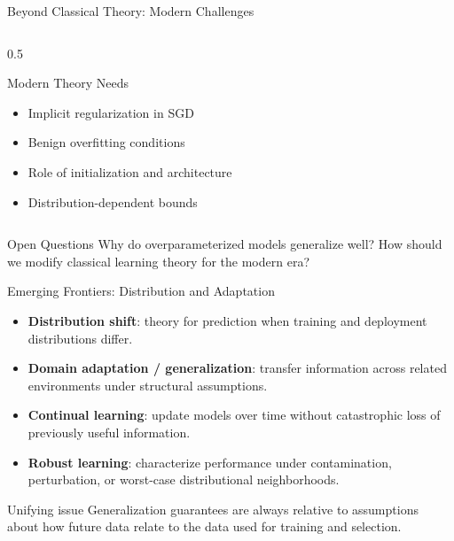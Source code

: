 \documentclass[aspectratio=169,11pt]{beamer}
\begin{document}
\begin{frame}{Beyond Classical Theory: Modern Challenges}
\begin{columns}
\begin{column}{0.5\textwidth}
\begin{block}{Modern Theory Needs}
\begin{itemize}
\item Implicit regularization in SGD
\item Benign overfitting conditions
\item Role of initialization and architecture
\item Distribution-dependent bounds
\end{itemize}
\end{block}
\end{column}
\end{columns}

\begin{alertblock}{Open Questions}
Why do overparameterized models generalize well? How should we modify classical learning theory for the modern era?
\end{alertblock}
\end{frame}

\begin{frame}{Emerging Frontiers: Distribution and Adaptation}
\begin{itemize}
  \item \textbf{Distribution shift}: theory for prediction when training and deployment distributions differ.
  \item \textbf{Domain adaptation / generalization}: transfer information across related environments under structural assumptions.
  \item \textbf{Continual learning}: update models over time without catastrophic loss of previously useful information.
  \item \textbf{Robust learning}: characterize performance under contamination, perturbation, or worst-case distributional neighborhoods.
\end{itemize}

\begin{alertblock}{Unifying issue}
Generalization guarantees are always relative to assumptions about how future data relate to the data used for training and selection.
\end{alertblock}
\end{frame}
\end{document}
